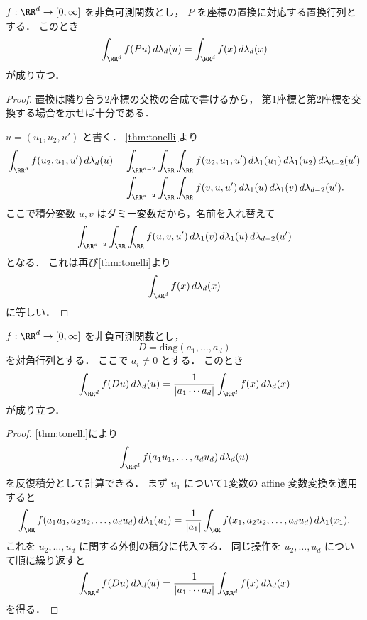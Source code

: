 \begin{lemma}[座標の入れ替え]\label{lem:change-variables-coordinate-permutation}
$f:\RR^d\to[0,\infty]$ を非負可測関数とし，
$P$ を座標の置換に対応する置換行列とする．
このとき
\[
\int_{\RR^d}f(Pu)\,d\lambda_d(u)=\int_{\RR^d}f(x)\,d\lambda_d(x)
\]
が成り立つ．
\end{lemma}
\begin{proof}
置換は隣り合う2座標の交換の合成で書けるから，
第1座標と第2座標を交換する場合を示せば十分である．

$u=(u_1,u_2,u')$ と書く．
\cref{thm:tonelli}より
\begin{align*}
\int_{\RR^d}f(u_2,u_1,u')\,d\lambda_d(u)
&=
\int_{\RR^{d-2}}\int_{\RR}\int_{\RR}f(u_2,u_1,u')\,d\lambda_1(u_1)\,d\lambda_1(u_2)\,d\lambda_{d-2}(u') \\
&=
\int_{\RR^{d-2}}\int_{\RR}\int_{\RR}f(v,u,u')\,d\lambda_1(u)\,d\lambda_1(v)\,d\lambda_{d-2}(u').
\end{align*}
ここで積分変数 $u,v$ はダミー変数だから，名前を入れ替えて
\[
\int_{\RR^{d-2}}\int_{\RR}\int_{\RR}f(u,v,u')\,d\lambda_1(v)\,d\lambda_1(u)\,d\lambda_{d-2}(u')
\]
となる．
これは再び\cref{thm:tonelli}より
\[
\int_{\RR^d}f(x)\,d\lambda_d(x)
\]
に等しい．
\end{proof}

\begin{lemma}[対角行列]\label{lem:change-variables-diagonal}
$f:\RR^d\to[0,\infty]$ を非負可測関数とし，
\[
D=\mathrm{diag}(a_1,\dots,a_d)
\]
を対角行列とする．
ここで $a_i\ne 0$ とする．
このとき
\[
\int_{\RR^d}f(Du)\,d\lambda_d(u)
=
\frac{1}{|a_1\cdots a_d|}\int_{\RR^d}f(x)\,d\lambda_d(x)
\]
が成り立つ．
\end{lemma}
\begin{proof}
\cref{thm:tonelli}により
\[
\int_{\RR^d}f(a_1u_1,\dots,a_du_d)\,d\lambda_d(u)
\]
を反復積分として計算できる．
まず $u_1$ について1変数の affine 変数変換を適用すると
\begin{align*}
\int_{\RR}f(a_1u_1,a_2u_2,\dots,a_du_d)\,d\lambda_1(u_1)
=
\frac1{|a_1|}
\int_{\RR}f(x_1,a_2u_2,\dots,a_du_d)\,d\lambda_1(x_1).
\end{align*}
これを $u_2,\dots,u_d$ に関する外側の積分に代入する．
同じ操作を $u_2,\dots,u_d$ について順に繰り返すと
\[
\int_{\RR^d}f(Du)\,d\lambda_d(u)
=
\frac{1}{|a_1\cdots a_d|}\int_{\RR^d}f(x)\,d\lambda_d(x)
\]
を得る．
\end{proof}


